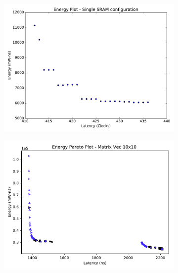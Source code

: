 \begin{figure}[ht]
\centering
\begin{subfigure}{.33\textwidth}
  \centering
  \includegraphics[width=\textwidth]{graphs/energy_plot_single_sram.pdf}
  \caption{}
  \label{fig:single_sram}
\end{subfigure}%
\begin{subfigure}{.33\textwidth}
  \centering
  \includegraphics[width=\textwidth]{graphs/EnergyParetoMatrixVec10.pdf}
  \caption{}
  \label{fig:sram_vs_mram_pareto_vec}
\end{subfigure}
\begin{subfigure}{.33\textwidth}
  \centering

\end{subfigure}
\end{figure}
